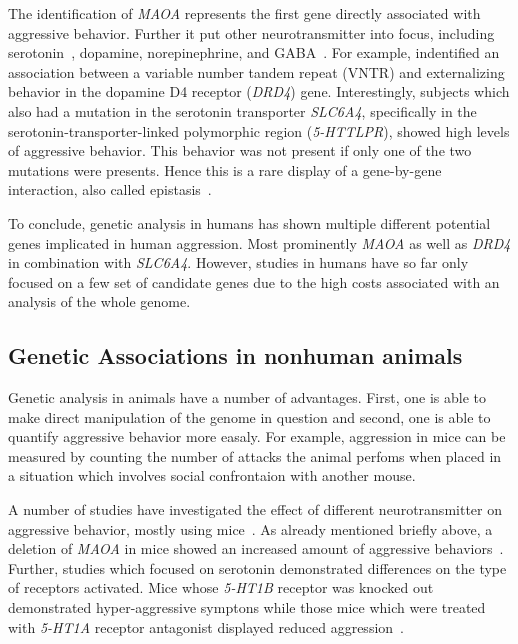 The identification of \textit{MAOA} represents the first gene directly associated with aggressive behavior.
Further it put other neurotransmitter into focus, including serotonin~\cite{Murphy2008}, dopamine, norepinephrine, and GABA~\cite{Marino2005,Miczek2002}.
For example, \citet{Hohmann2009} indentified an association between a variable number tandem repeat (VNTR) and externalizing behavior in the dopamine D4 receptor (\textit{DRD4}) gene.
Interestingly, subjects which also had a mutation in the serotonin transporter \textit{SLC6A4}, specifically in the serotonin-transporter-linked polymorphic region (\textit{5-HTTLPR}), showed high levels of aggressive behavior.
This behavior was not present if only one of the two mutations were presents.
Hence this is a rare display of a gene-by-gene interaction, also called epistasis~\cite{Anholt2012}.

To conclude, genetic analysis in humans has shown multiple different potential genes implicated in human aggression.
Most prominently \textit{MAOA} as well as \textit{DRD4} in combination with \textit{SLC6A4}.
However, studies in humans have so far only focused on a few set of candidate genes due to the high costs associated with an analysis of the whole genome.

\subsection{Genetic Associations in nonhuman animals}
\label{sub:genetic_associations_in_animals}

Genetic analysis in animals have a number of advantages.
First, one is able to make direct manipulation of the genome in question and second, one is able to quantify aggressive behavior more easaly.
For example, aggression in mice can be measured by counting the number of attacks the animal perfoms when placed in a situation which involves social confrontaion with another mouse.

A number of studies have investigated the effect of different neurotransmitter on aggressive behavior, mostly using mice~\cite{Anholt2012}.
As already mentioned briefly above, a deletion of \textit{MAOA} in mice showed an increased amount of aggressive behaviors~\cite{Cases1995b}.
Further, studies which focused on serotonin demonstrated differences on the type of receptors activated.
Mice whose \textit{5-HT1B} receptor was knocked out demonstrated hyper-aggressive symptons while those mice which were treated with \textit{5-HT1A} receptor antagonist displayed reduced aggression~\cite{Saudou1994,Bell1994}.


